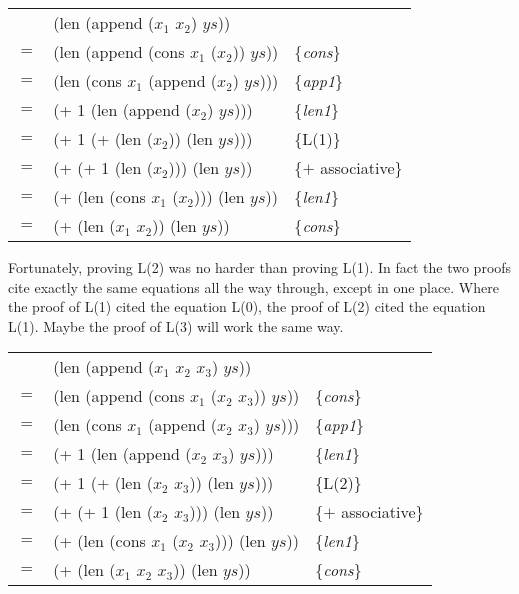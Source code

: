 \begin{center}
\begin{tabular}{lll}
    & (len (append ($x_1$ $x_2$) $ys$))         &                     \\
$=$ & (len (append (cons $x_1$ ($x_2$)) $ys$))  & \{\emph{cons}\}     \\
$=$ & (len (cons $x_1$ (append ($x_2$) $ys$)))  & \{\emph{app1}\}     \\
$=$ & (+ 1 (len (append ($x_2$) $ys$)))         & \{\emph{len1}\}     \\
$=$ & (+ 1 (+ (len ($x_2$)) (len $ys$)))        & \{L(1)\}            \\
$=$ & (+ (+ 1 (len ($x_2$))) (len $ys$))        & \{$+$ associative\} \\
$=$ & (+ (len (cons $x_1$ ($x_2$))) (len $ys$)) & \{\emph{len1}\}     \\
$=$ & (+ (len ($x_1$ $x_2$)) (len $ys$))        & \{\emph{cons}\}     \\
\end{tabular}
\end{center}

Fortunately, proving L(2) was no harder than proving L(1). In fact the two proofs cite exactly the same equations all the way through, except in one place. Where the proof of L(1) cited the equation L(0), the proof of L(2) cited the equation L(1). Maybe the proof of L(3) will work the same way.

\begin{center}
\begin{tabular}{lll}
    & (len (append ($x_1$ $x_2$ $x_3$) $ys$))         &                     \\
$=$ & (len (append (cons $x_1$ ($x_2$ $x_3$)) $ys$))  & \{\emph{cons}\}     \\
$=$ & (len (cons $x_1$ (append ($x_2$ $x_3$) $ys$)))  & \{\emph{app1}\}     \\
$=$ & (+ 1 (len (append ($x_2$ $x_3$) $ys$)))         & \{\emph{len1}\}     \\
$=$ & (+ 1 (+ (len ($x_2$ $x_3$)) (len $ys$)))        & \{L(2)\}            \\
$=$ & (+ (+ 1 (len ($x_2$ $x_3$))) (len $ys$))        & \{$+$ associative\} \\
$=$ & (+ (len (cons $x_1$ ($x_2$ $x_3$))) (len $ys$)) & \{\emph{len1}\}     \\
$=$ & (+ (len ($x_1$ $x_2$ $x_3$)) (len $ys$))        & \{\emph{cons}\}     \\
\end{tabular}
\end{center}

